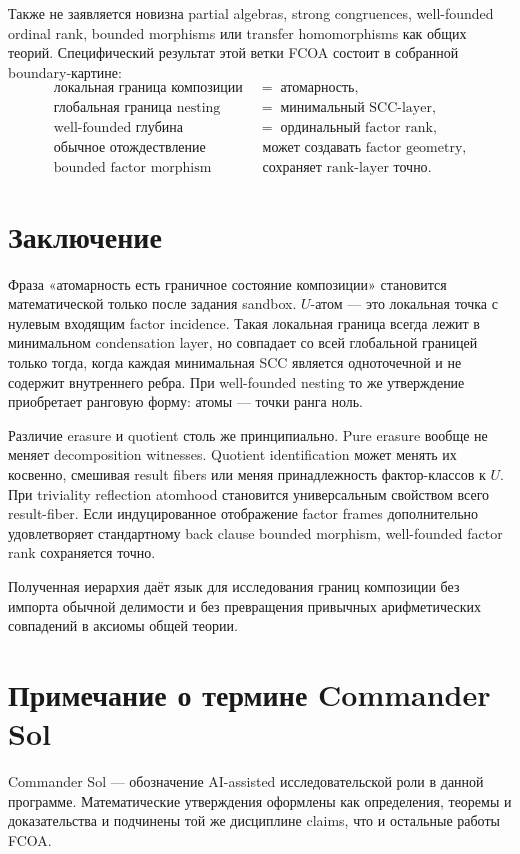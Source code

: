 \documentclass[11pt]{article}
\theoremstyle{definition}
\theoremstyle{remark}
\begin{document}
Также не заявляется новизна partial algebras, strong congruences, well-founded ordinal rank, bounded morphisms или transfer homomorphisms как общих теорий. Специфический результат этой ветки FCOA состоит в собранной boundary-картине:
\begin{equation}
\boxed{
\begin{aligned}
\text{локальная граница композиции} &\;=\; \text{атомарность},\\
\text{глобальная граница nesting} &\;=\; \text{минимальный SCC-layer},\\
\text{well-founded глубина} &\;=\; \text{ординальный factor rank},\\
\text{обычное отождествление} &\;\text{ может создавать factor geometry},\\
\text{bounded factor morphism} &\;\text{ сохраняет rank-layer точно}.
\end{aligned}}
\label{eq:synthesis}
\end{equation}

\section{Заключение}

Фраза «атомарность есть граничное состояние композиции» становится математической только после задания sandbox. \(U\)-атом — это локальная точка с нулевым входящим factor incidence. Такая локальная граница всегда лежит в минимальном condensation layer, но совпадает со всей глобальной границей только тогда, когда каждая минимальная SCC является одноточечной и не содержит внутреннего ребра. При well-founded nesting то же утверждение приобретает ранговую форму: атомы — точки ранга ноль.

Различие erasure и quotient столь же принципиально. Pure erasure вообще не меняет decomposition witnesses. Quotient identification может менять их косвенно, смешивая result fibers или меняя принадлежность фактор-классов к \(U\). При triviality reflection atomhood становится универсальным свойством всего result-fiber. Если индуцированное отображение factor frames дополнительно удовлетворяет стандартному back clause bounded morphism, well-founded factor rank сохраняется точно.

Полученная иерархия даёт язык для исследования границ композиции без импорта обычной делимости и без превращения привычных арифметических совпадений в аксиомы общей теории.

\section*{Примечание о термине Commander Sol}
Commander Sol — обозначение AI-assisted исследовательской роли в данной программе. Математические утверждения оформлены как определения, теоремы и доказательства и подчинены той же дисциплине claims, что и остальные работы FCOA.



\end{document}

